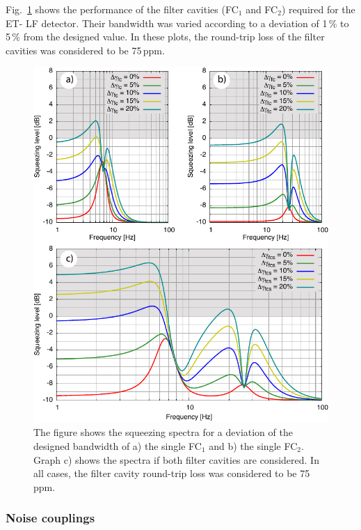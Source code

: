 Fig.~\ref{fig:devBW} shows the performance of the filter cavities
(FC$_1$ and FC$_2$)  required for the ET- LF detector. Their bandwidth
was varied according to a deviation of 1\,\% to 5\,\% from the
designed value. In these plots, the round-trip loss of the filter
cavities was considered to be 75\,ppm.

\begin{figure}
\centering
\includegraphics{./Sec_Optics/FCi-devbw_reviewAI.pdf}
\caption{The figure shows the squeezing spectra for a deviation of the designed bandwidth of a) the single FC$_1$  and b) the single FC$_2$. Graph c) shows the spectra if both  filter cavities are considered. In all cases, the filter cavity round-trip loss was considered to be 75\,ppm.}
\label{fig:devBW}
\end{figure}



\FloatBarrier
\subsubsection{Noise couplings}\label{app:phsnoise}

